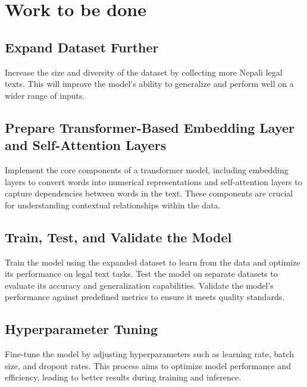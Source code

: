 \chapter{Work to be done}
\section{Expand Dataset Further}
Increase the size and diversity of the dataset by collecting more Nepali legal texts. This will improve the model's ability to generalize and perform well on a wider range of inputs.

\section{Prepare Transformer-Based Embedding Layer and Self-Attention Layers}
Implement the core components of a transformer model, including embedding layers to convert words into numerical representations and self-attention layers to capture dependencies between words in the text. These components are crucial for understanding contextual relationships within the data.

\section{Train, Test, and Validate the Model}
Train the model using the expanded dataset to learn from the data and optimize its performance on legal text tasks. Test the model on separate datasets to evaluate its accuracy and generalization capabilities. Validate the model's performance against predefined metrics to ensure it meets quality standards.

\section{Hyperparameter Tuning}
Fine-tune the model by adjusting hyperparameters such as learning rate, batch size, and dropout rates. This process aims to optimize model performance and efficiency, leading to better results during training and inference.